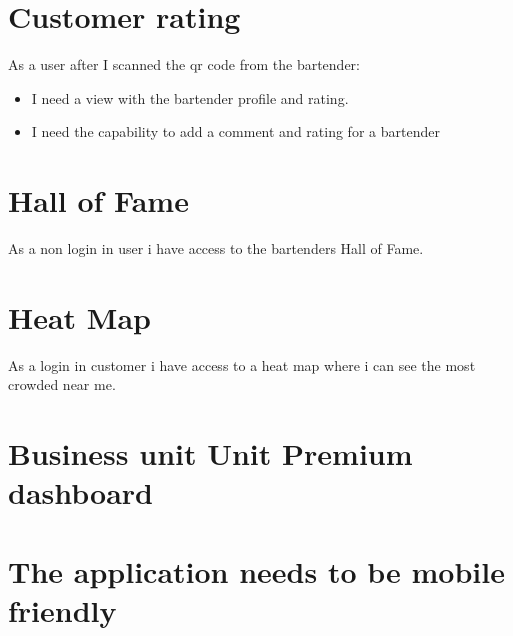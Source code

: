 \documentclass{scrreprt}
\begin{document}
\section{Customer rating}
As a user after I scanned the qr code from the bartender:
\begin{itemize}
    \item I need a view with the bartender profile and rating.
    \item I need the capability to add a comment and rating for a bartender
\end{itemize}

\section{Hall of Fame}
As a non login in user i have access to the bartenders Hall of Fame.

\section{Heat Map}
As a login in customer i have access to a heat map where i can see the most crowded near me.

\section{Business unit Unit Premium dashboard}

\section{The application needs to be mobile friendly}
\end{document}
